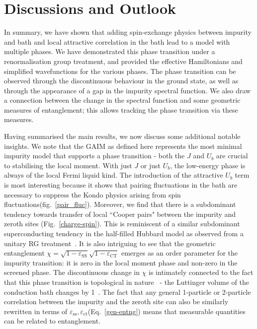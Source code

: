 \documentclass[reprint,superscriptaddress,floatfix]{revtex4-2}
\begin{document}
\section{Discussions and Outlook}
\label{concl}

In summary, we have shown that adding spin-exchange physics between impurity and bath and local attractive correlation in the bath lead to a model with multiple phases. We have demonstrated this phase transition under a renormalisation group treatment, and provided the effective Hamiltonians and simplified wavefunctions for the various phases. The phase transition can be observed through the discontinuous behaviour in the ground state, as well as through the appearance of a gap in the impurity spectral function. We also draw a connection between the change in the spectral function and some geometric measures of entanglement; this allows tracking the phase transition via these measures.

Having summarised the main results, we now discuss some additional notable insights. We note that the GAIM as defined here represents the most minimal impurity model that supports a phase transition - both the \(J\) and \(U_b\) are crucial to stabilising the local moment. With just \(J\) or just \(U_b\), the low-energy phase is always of the local Fermi liquid kind. The introduction of the attractive \(U_b\) term is most interesting because it shows that pairing fluctuations in the bath are necessary to suppress the Kondo physics arising from spin fluctuations(fig.~\ref{pair_fluc}). Moreover, we find that there is a subdominant tendency towards transfer of local ``Cooper pairs" between the impurity and zeroth sites (Fig.~\ref{charge-spin}). This is reminiscent of a similar subdominant superconducting tendency in the half-filled Hubbard model as observed from a unitary RG treatment~\cite{anirbanmott1,anirbanmott2}.
It is also intriguing to see that the geometric entanglement \(\chi = \sqrt{1 -\varepsilon_\text{SS}}\sqrt{1 -\varepsilon_\text{CT}}\) emerges as an order parameter for the impurity transition: it is zero in the local moment phase and non-zero in the screened phase. The discontinuous change in \(\chi\) is intimately connected to the fact that this phase transition is topological in nature~\cite{oshikawa2000topological,seki2017topological} -  the Luttinger volume of the conduction bath changes by 1~\cite{martin-physrevlett.48.362}. The fact that any general 1-particle or 2-particle correlation between the impurity and the zeroth site can also be similarly rewritten in terms of \(\varepsilon_\text{ss},\varepsilon_\text{ct}\)(Eq.~\ref{gen-entng}) means that measurable quantities can be related to entanglement.
\end{document}

